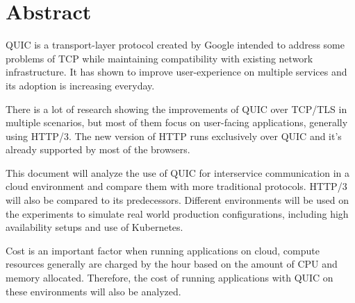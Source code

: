 \section*{Abstract}

QUIC is a transport-layer protocol created by Google intended to address some problems of TCP while maintaining compatibility with existing network infrastructure. It has shown to improve user-experience on multiple services and its adoption is increasing everyday.

There is a lot of research showing the improvements of QUIC over TCP/TLS in multiple scenarios, but most of them focus on user-facing applications, generally using HTTP/3. The new version of HTTP runs exclusively over QUIC and it’s already supported by most of the browsers.

This document will analyze the use of QUIC for interservice communication in a cloud environment and compare them with more traditional protocols. HTTP/3 will also be compared to its predecessors. Different environments will be used on the experiments to simulate real world production configurations, including high availability setups and use of Kubernetes.

Cost is an important factor when running applications on cloud, compute resources generally are charged by the hour based on the amount of CPU and memory allocated. Therefore, the cost of running applications with QUIC on these environments will also be analyzed.
